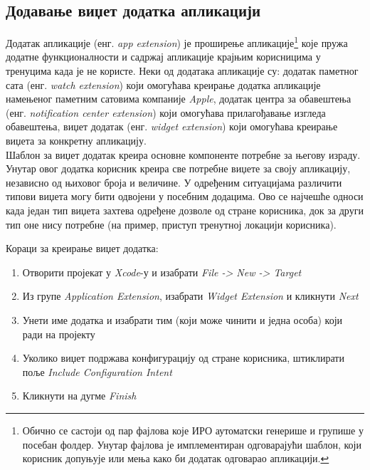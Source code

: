 \documentclass[12pt,oneside]{memoir}
\begin{document}
\subsection{Додавање виџет додатка апликацији}
\indent Додатак апликације (енг. \textit{app extension}) је проширење апликације\footnote{Обично се састоји од пар фајлова које ИРО аутоматски генерише и групише у посебан фолдер. Унутар фајлова је имплементиран одговарајући шаблон, који корисник допуњује или мења како би додатак одговарао апликацији.} које пружа додатне функционалности и садржај апликације крајњим корисницима у тренуцима када је не користе. Неки од додатака апликације су: додатак паметног сата (енг. \textit{watch extension}) који омогућава креирање додатка апликације намењеног паметним сатовима компаније \textit{Apple}, додатак центра за обавештења (енг. \textit{notification center extension}) који омогућава прилагођавање изгледа обавештења, виџет додатак (енг. \textit{widget extension}) који омогућава креирање виџета за конкретну апликацију.
\\
\indent Шаблон за виџет додатак креира основне компоненте потребне за његову израду. Унутар овог додатка корисник креира све потребне виџете за своју апликацију, независно од њиховог броја и величине. У одређеним ситуацијама различити типови виџета могу бити одвојени у посебним додацима. Ово се најчешће односи када један тип виџета захтева одређене дозволе од стране корисника, док за други тип оне нису потребне (на пример, приступ тренутној локацији корисника).

\indent Кораци за креирање виџет додатка:
\begin{enumerate}
    \item Отворити пројекат у \textit{Xcode}-у и изабрати \textit{File -> New -> Target}
    
    \item Из групе \textit{Application Extension}, изабрати \textit{Widget Extension} и кликнути \textit{Next}
    
    \item Унети име додатка и изабрати тим (који може чинити и једна особа) који ради на пројекту
    
    \item Уколико виџет подржава конфигурацију од стране корисника, штиклирати поље \textit{Include Configuration Intent}
    
    \item Кликнути на дугме \textit{Finish}
    
\end{enumerate}
\end{document}
